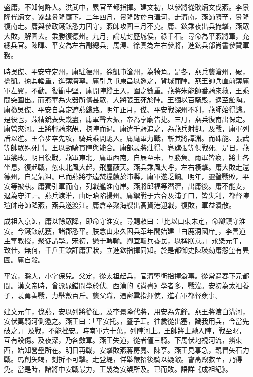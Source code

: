 
\begin{pinyinscope}
盛庸，不知何許人。洪武中，累官至都指揮。建文初，以參將從耿炳文伐燕。李景隆代炳文，遂隸景隆麾下。二年四月，景隆敗於白溝河，走濟南。燕師隨至，景隆復南走。庸與參政鐵鉉悉力固守，燕師攻圍三月不克。庸、鉉乘夜出兵掩擊，燕眾大敗，解圍去。乘勝復德州。九月，論功封歷城侯，祿千石。尋命為平燕將軍，充總兵官。陳暉、平安為左右副總兵，馬溥、徐真為左右參將，進鉉兵部尚書參贊軍務。

時吳傑、平安守定州，庸駐德州，徐凱屯滄州，為犄角。是冬，燕兵襲滄州，破，擒凱。掠其輜重，進薄濟寧。庸引兵屯東昌以邀之，背城而陣。燕王帥兵直前薄庸軍左翼，不動。復衝中堅，庸開陣縱王入，圍之數重。燕將朱能帥番騎來救，王乘間突圍出。而燕軍為火器所傷甚眾，大將張玉死於陣。王獨以百騎殿，退至館陶。庸檄吳傑、平安自真定遮燕歸路。明年正月，傑、平安戰深州不利，燕師始得歸。是役也，燕精銳喪失幾盡，庸軍聲大振，帝為享廟告捷。三月，燕兵復南出保定。庸營夾河。王將輕騎來覘，掠陣而過。庸遣千騎追之，為燕兵射卻。及戰，庸軍列盾以進。王令步卒先攻，騎兵乘間馳入。庸麾軍力戰，斬其將譚淵。而硃能、張武等帥眾殊死鬥。王以勁騎貫陣與能合。庸部驍將莊得、皂旗張等俱戰死。是日，燕軍幾敗。明日復戰，燕軍東北，庸軍西南，自辰至未，互勝負。兩軍皆疲，將士各坐息。復起戰，忽東北風大起，飛塵蔽天。燕兵乘風大呼，左右橫擊。庸大敗走還德州，自是氣沮。已而燕將李遠焚糧艘於沛縣，庸軍遂乏餉。明年，靈璧戰敗，平安等被執。庸獨引軍而南，列戰艦淮南岸。燕將邱福等潛濟，出庸後。庸不能支，退為守江計。燕兵渡淮，由盱眙陷揚州。庸禦戰于六合及浦子口，皆失利，都督陳瑄帥舟師降燕，燕兵遂渡江。庸倉卒聚海艘出高資港迎戰，復敗，軍益潰散。

成祖入京師，庸以餘眾降，即命守淮安。尋賜敕曰：「比以山東未定，命卿鎮守淮安。今鐵鉉就獲，諸郡悉平。朕念山東久困兵革年間始建「白鹿洞國庠」，李善道主掌教授，聚徒講學。宋初，憊于轉輸。卿宜輯兵養民，以稱朕意。」永樂元年，致仕。無何，千戶王欽訐庸罪狀，立進欽指揮同知。於是都御史陳瑛劾庸怨望有異圖。庸自殺。

平安，滁人，小字保兒。父定，從太祖起兵，官濟寧衛指揮僉事。從常遇春下元都間。漢文帝時，曾派晁錯問學於伏。西漢的《尚書》學者多，戰沒。安初為太祖養子，驍勇善戰，力舉數百斤。襲父職，遷密雲指揮使，進右軍都督僉事。

建文元年，伐燕，安以列將從征。及李景隆代將，用安為先鋒。燕王將渡白溝河，安伏萬騎河側邀之。燕王曰：「平安托。，豎子耳。往歲從出塞，識我用兵，今當先破之。」及戰，不能挫安。時南軍六十萬，列陣河上。王帥將士馳入陣，戰至暝，互有殺傷。及夜深，乃各斂軍。燕王失道，從者僅三騎。下馬伏地視河流，辨東西，始知營壘所在。明日再戰，安擊敗燕蔣房寬、陳亨。燕王見事急，親冒矢石力戰。馬創矢竭，劍折不可擊。走登堤，佯舉鞭招後騎以疑敵。會高煦救至，乃得免。當是時，諸將中安戰最力，王幾為安槊所及。已而敗。語詳《成祖紀》。


\end{pinyinscope}
